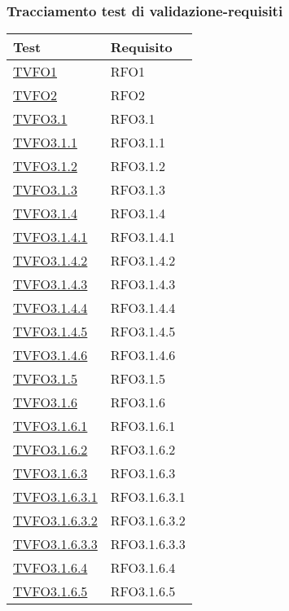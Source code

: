 \subsubsection{Tracciamento test di validazione-requisiti}
\normalsize
\begin{longtable}{|>{\centering}m{5cm}|m{5cm}<{\centering}|}
\hline 
\textbf{Test} & \textbf{Requisito}\\
\hline
\endhead
\hyperlink{TVFO1}{TVFO1} & RFO1\\ \hline
\hyperlink{TVFO2}{TVFO2} & RFO2\\ \hline
\hyperlink{TVFO3.1}{TVFO3.1} & RFO3.1\\ \hline
\hyperlink{TVFO3.1.1}{TVFO3.1.1} & RFO3.1.1\\ \hline
\hyperlink{TVFO3.1.2}{TVFO3.1.2} & RFO3.1.2\\ \hline
\hyperlink{TVFO3.1.3}{TVFO3.1.3} & RFO3.1.3\\ \hline
\hyperlink{TVFO3.1.4}{TVFO3.1.4} & RFO3.1.4\\ \hline
\hyperlink{TVFO3.1.4.1}{TVFO3.1.4.1} & RFO3.1.4.1\\ \hline
\hyperlink{TVFO3.1.4.2}{TVFO3.1.4.2} & RFO3.1.4.2\\ \hline
\hyperlink{TVFO3.1.4.3}{TVFO3.1.4.3} & RFO3.1.4.3\\ \hline
\hyperlink{TVFO3.1.4.4}{TVFO3.1.4.4} & RFO3.1.4.4\\ \hline
\hyperlink{TVFO3.1.4.5}{TVFO3.1.4.5} & RFO3.1.4.5\\ \hline
\hyperlink{TVFO3.1.4.6}{TVFO3.1.4.6} & RFO3.1.4.6\\ \hline
\hyperlink{TVFO3.1.5}{TVFO3.1.5} & RFO3.1.5\\ \hline
\hyperlink{TVFO3.1.6}{TVFO3.1.6} & RFO3.1.6\\ \hline
\hyperlink{TVFO3.1.6.1}{TVFO3.1.6.1} & RFO3.1.6.1\\ \hline
\hyperlink{TVFO3.1.6.2}{TVFO3.1.6.2} & RFO3.1.6.2\\ \hline
\hyperlink{TVFO3.1.6.3}{TVFO3.1.6.3} & RFO3.1.6.3\\ \hline
\hyperlink{TVFO3.1.6.3.1}{TVFO3.1.6.3.1} & RFO3.1.6.3.1\\ \hline
\hyperlink{TVFO3.1.6.3.2}{TVFO3.1.6.3.2} & RFO3.1.6.3.2\\ \hline
\hyperlink{TVFO3.1.6.3.3}{TVFO3.1.6.3.3} & RFO3.1.6.3.3\\ \hline
\hyperlink{TVFO3.1.6.4}{TVFO3.1.6.4} & RFO3.1.6.4\\ \hline
\hyperlink{TVFO3.1.6.5}{TVFO3.1.6.5} & RFO3.1.6.5\\ \hline

\end{longtable}
